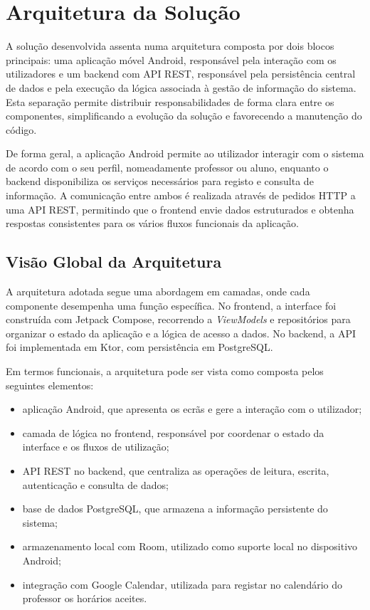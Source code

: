 %
%
\chapter{Arquitetura da Solução} \label{cap:arquitetura}

A solução desenvolvida assenta numa arquitetura composta por dois blocos principais: uma aplicação móvel Android,
responsável pela interação com os utilizadores e um backend com API REST, responsável pela persistência central
de dados e pela execução da lógica associada à gestão de informação do sistema. Esta separação permite distribuir
responsabilidades de forma clara entre os componentes, simplificando a evolução da solução e favorecendo a manutenção do código.

De forma geral, a aplicação Android permite ao utilizador interagir com o sistema de acordo com o seu perfil,
nomeadamente professor ou aluno, enquanto o backend disponibiliza os serviços necessários para registo e consulta
de informação. A comunicação entre ambos é realizada através de pedidos HTTP a uma API REST, permitindo que o
frontend envie dados estruturados e obtenha respostas consistentes para os vários fluxos funcionais da aplicação.

\section{Visão Global da Arquitetura}

A arquitetura adotada segue uma abordagem em camadas, onde cada componente desempenha uma função específica.
No frontend, a interface foi construída com Jetpack Compose, recorrendo a \textit{ViewModels} e repositórios
para organizar o estado da aplicação e a lógica de acesso a dados.
No backend, a API foi implementada em Ktor, com persistência em PostgreSQL.

Em termos funcionais, a arquitetura pode ser vista como composta pelos seguintes elementos:

\begin{itemize}
    \item aplicação Android, que apresenta os ecrãs e gere a interação com o utilizador;
    \item camada de lógica no frontend, responsável por coordenar o estado da interface e os fluxos de utilização;
    \item API REST no backend, que centraliza as operações de leitura, escrita, autenticação e consulta de dados;
    \item base de dados PostgreSQL, que armazena a informação persistente do sistema;
    \item armazenamento local com Room, utilizado como suporte local no dispositivo Android;
    \item integração com Google Calendar, utilizada para registar no calendário do professor os horários aceites.
\end{itemize}


